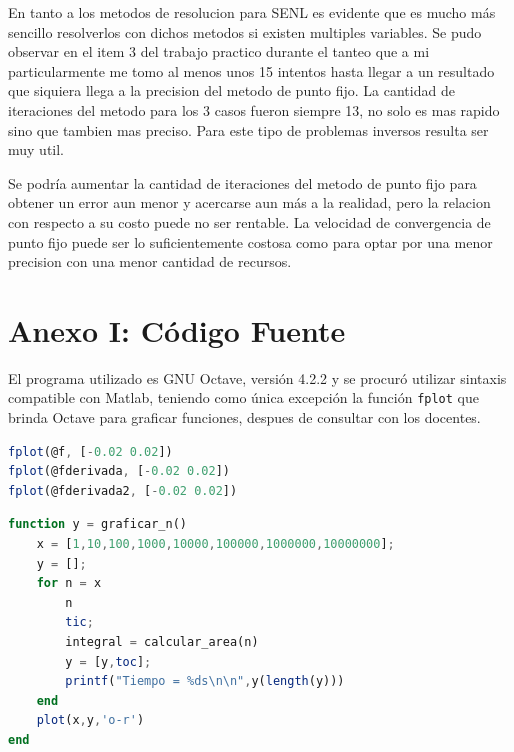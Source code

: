 \documentclass[11pt,a4paper]{article}
\begin{document}
En tanto a los metodos de resolucion para SENL es evidente que es mucho más sencillo resolverlos con dichos metodos si existen multiples variables. Se pudo observar en el item 3 del trabajo practico durante el tanteo que a mi particularmente me tomo al menos unos 15 intentos hasta llegar a un resultado que siquiera llega a la precision del metodo de punto fijo. La cantidad de iteraciones del metodo para los 3 casos fueron siempre 13, no solo es mas rapido sino que tambien mas preciso. Para este tipo de problemas inversos resulta ser muy util.

Se podría aumentar la cantidad de iteraciones del metodo de punto fijo para obtener un error aun menor y acercarse aun más a la realidad, pero la relacion con respecto a su costo puede no ser rentable. La velocidad de convergencia de punto fijo puede ser lo suficientemente costosa como para optar por una menor precision con una menor cantidad de recursos.

\newpage
\appendix
\section{Anexo I: Código Fuente}

El programa utilizado es GNU Octave, versión 4.2.2 y se procuró utilizar sintaxis compatible con Matlab, teniendo como única excepción la función \texttt{fplot} que brinda Octave para graficar funciones, despues de consultar con los docentes.



\newpage


\newpage


\newpage
\begin{lstlisting}[language=Octave,title=Generación de graficos]
fplot(@f, [-0.02 0.02])
fplot(@fderivada, [-0.02 0.02])
fplot(@fderivada2, [-0.02 0.02])
\end{lstlisting}

\begin{lstlisting}[language=Octave,title=Truncamiento y gráfico de n]
function y = graficar_n()
    x = [1,10,100,1000,10000,100000,1000000,10000000];
    y = [];
    for n = x
        n
        tic;
        integral = calcular_area(n)
        y = [y,toc]; 
        printf("Tiempo = %ds\n\n",y(length(y)))   
    end
    plot(x,y,'o-r')
end
\end{lstlisting}
\end{document}
